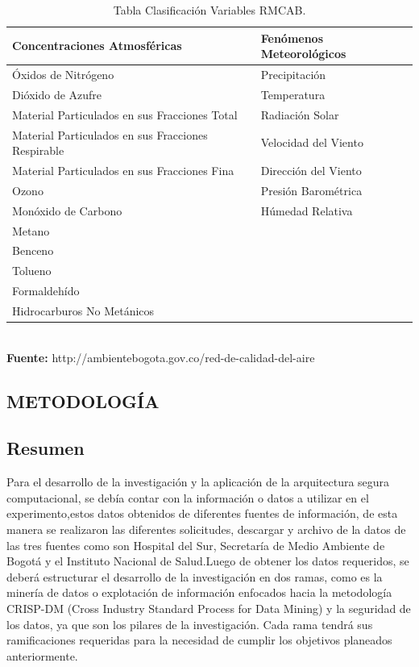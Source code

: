 \documentclass[a4paper,openright,12pt]{book}
\theoremstyle{definition}
\theoremstyle{remark}
\begin{document}
\begin{table}[!htbp]
\begin{center}
\caption{Tabla Clasificación Variables RMCAB.}
\resizebox{10cm}{!} {
\begin{tabular}{|l|l|}
\hline
Concentraciones Atmosféricas & Fenómenos  Meteorológicos \\
\hline \hline
Óxidos de Nitrógeno & Precipitación \\ \hline
Dióxido de Azufre & Temperatura \\ \hline
Material Particulados en sus Fracciones Total & Radiación Solar \\ \hline
Material Particulados en sus Fracciones Respirable & Velocidad del Viento \\ \hline
Material Particulados en sus Fracciones Fina & Dirección del Viento \\ \hline
Ozono & Presión Barométrica \\ \hline
Monóxido de Carbono & Húmedad Relativa \\ \hline
Metano &  \\ \hline
Benceno &  \\ \hline
Tolueno &  \\ \hline
Formaldehído &  \\ \hline
Hidrocarburos No Metánicos & \\ \hline
\end{tabular}
}
\label{tabla:variables RMCAB}
\\\textbf{Fuente:} http://ambientebogota.gov.co/red-de-calidad-del-aire
\end{center}
\end{table}


\begin{center}
\chapter{METODOLOGÍA}\label{cap.metodologia}
\end{center}
\section{Resumen}
Para el desarrollo de la investigación y la aplicación de la arquitectura segura computacional, se debía contar con la información o datos a utilizar en el experimento,estos datos obtenidos de diferentes fuentes de información, de esta manera se realizaron las diferentes solicitudes, descargar y archivo de la datos de las tres fuentes como son Hospital del Sur, Secretaría de Medio Ambiente de Bogotá y el Instituto Nacional de Salud.Luego de obtener los datos requeridos, se deberá estructurar el desarrollo de la investigación en dos ramas, como es la minería de datos o explotación de información enfocados hacia la metodología CRISP-DM (Cross Industry Standard Process for Data Mining)  y la seguridad de los datos, ya que son los pilares de la investigación. Cada rama tendrá sus ramificaciones requeridas para la necesidad de cumplir los objetivos planeados anteriormente.
\end{document}
